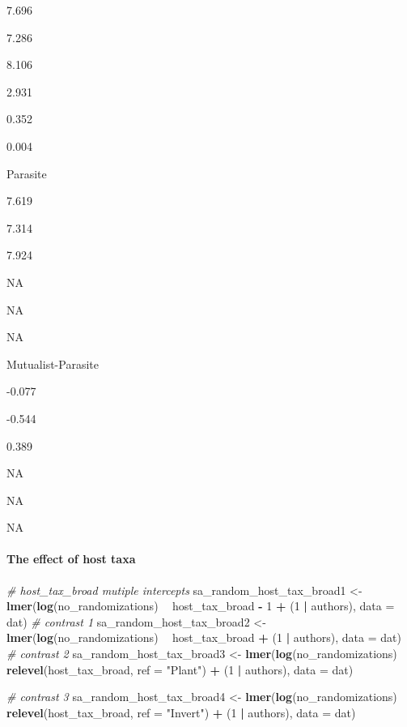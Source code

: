 \documentclass[
]{article}
\newenvironment{Shaded}{\begin{snugshade}}{\end{snugshade}}
\newcommand{\CommentTok}[1]{\textcolor[rgb]{0.56,0.35,0.01}{\textit{#1}}}
\newcommand{\DataTypeTok}[1]{\textcolor[rgb]{0.13,0.29,0.53}{#1}}
\newcommand{\DecValTok}[1]{\textcolor[rgb]{0.00,0.00,0.81}{#1}}
\newcommand{\KeywordTok}[1]{\textcolor[rgb]{0.13,0.29,0.53}{\textbf{#1}}}
\newcommand{\NormalTok}[1]{#1}
\newcommand{\OperatorTok}[1]{\textcolor[rgb]{0.81,0.36,0.00}{\textbf{#1}}}
\newcommand{\StringTok}[1]{\textcolor[rgb]{0.31,0.60,0.02}{#1}}
\begin{document}
7.696

7.286

8.106

2.931

0.352

0.004

Parasite

7.619

7.314

7.924

NA

NA

NA

Mutualist-Parasite

-0.077

-0.544

0.389

NA

NA

NA

\hypertarget{the-effect-of-host-taxa-1}{%
\paragraph{The effect of host taxa}\label{the-effect-of-host-taxa-1}}

\begin{Shaded}
\begin{Highlighting}[]
\CommentTok{# host_tax_broad mutiple intercepts}
\NormalTok{sa_random_host_tax_broad1 <-}\StringTok{ }\KeywordTok{lmer}\NormalTok{(}\KeywordTok{log}\NormalTok{(no_randomizations) }\OperatorTok{~}\StringTok{ }\NormalTok{host_tax_broad }\OperatorTok{-}\StringTok{ }\DecValTok{1} \OperatorTok{+}\StringTok{ }\NormalTok{(}\DecValTok{1} \OperatorTok{|}\StringTok{ }
\StringTok{    }\NormalTok{authors), }\DataTypeTok{data =}\NormalTok{ dat)}
\CommentTok{# contrast 1}
\NormalTok{sa_random_host_tax_broad2 <-}\StringTok{ }\KeywordTok{lmer}\NormalTok{(}\KeywordTok{log}\NormalTok{(no_randomizations) }\OperatorTok{~}\StringTok{ }\NormalTok{host_tax_broad }\OperatorTok{+}\StringTok{ }\NormalTok{(}\DecValTok{1} \OperatorTok{|}\StringTok{ }
\StringTok{    }\NormalTok{authors), }\DataTypeTok{data =}\NormalTok{ dat)}
\CommentTok{# contrast 2}
\NormalTok{sa_random_host_tax_broad3 <-}\StringTok{ }\KeywordTok{lmer}\NormalTok{(}\KeywordTok{log}\NormalTok{(no_randomizations) }\OperatorTok{~}\StringTok{ }\KeywordTok{relevel}\NormalTok{(host_tax_broad, }
    \DataTypeTok{ref =} \StringTok{"Plant"}\NormalTok{) }\OperatorTok{+}\StringTok{ }\NormalTok{(}\DecValTok{1} \OperatorTok{|}\StringTok{ }\NormalTok{authors), }\DataTypeTok{data =}\NormalTok{ dat)}

\CommentTok{# contrast 3}
\NormalTok{sa_random_host_tax_broad4 <-}\StringTok{ }\KeywordTok{lmer}\NormalTok{(}\KeywordTok{log}\NormalTok{(no_randomizations) }\OperatorTok{~}\StringTok{ }\KeywordTok{relevel}\NormalTok{(host_tax_broad, }
    \DataTypeTok{ref =} \StringTok{"Invert"}\NormalTok{) }\OperatorTok{+}\StringTok{ }\NormalTok{(}\DecValTok{1} \OperatorTok{|}\StringTok{ }\NormalTok{authors), }\DataTypeTok{data =}\NormalTok{ dat)}
\end{Highlighting}
\end{Shaded}
\end{document}
